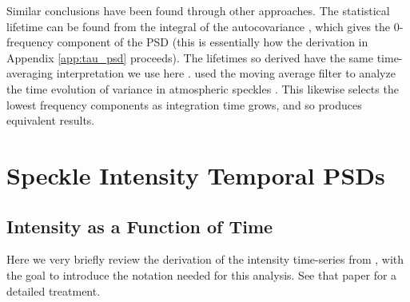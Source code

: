\documentclass[10pt,preprint]{aastex631}
\begin{document}
Similar conclusions have been found through other approaches.  The statistical lifetime can be found from the integral of the autocovariance \citep{1986JOSAA...3.1001A}, which gives the 0-frequency component of the PSD (this is essentially how the derivation in Appendix \ref{app:tau_psd} proceeds).  The lifetimes so derived have the same time-averaging interpretation we use here \citep{2006ApJ...637..541F}.  \citet{2006OExpr..14.7499P} used the moving average filter to analyze the time evolution of variance in atmospheric speckles \citep[see also][]{2005SPIE.5903..170M}.  This likewise selects the lowest frequency components as integration time grows, and so produces equivalent results.

\section{Speckle Intensity Temporal PSDs}
\label{sec:intensity}
\subsection{Intensity as a Function of Time}
Here we very briefly review the derivation of the intensity time-series from \citet{2018JATIS...4a9001M}, with the goal to introduce the notation needed for this analysis.  See that paper for a detailed treatment.
\end{document}
